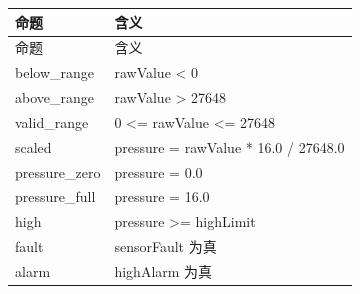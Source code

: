 \begin{longtable}{L{3.3cm}L{10.0cm}}

\toprule

命题 & 含义\\

\midrule

\endfirsthead

\toprule

命题 & 含义\\

\midrule

\endhead

{\ttfamily below\_range} & rawValue < 0\\

{\ttfamily above\_range} & rawValue > 27648\\

{\ttfamily valid\_range} & 0 <= rawValue <= 27648\\

{\ttfamily scaled} & pressure = rawValue * 16.0 / 27648.0\\

{\ttfamily pressure\_zero} & pressure = 0.0\\

{\ttfamily pressure\_full} & pressure = 16.0\\

{\ttfamily high} & pressure >= highLimit\\

{\ttfamily fault} & sensorFault 为真\\

{\ttfamily alarm} & highAlarm 为真\\

\bottomrule

\end{longtable}

